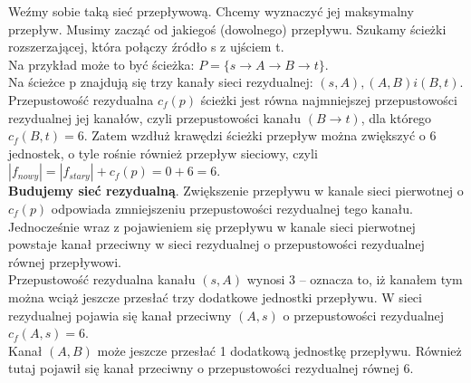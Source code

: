 \documentclass[main.tex]{subfiles}
\begin{document}
\begin{center}
    \end{center}

    Weźmy sobie taką sieć przepływową. Chcemy wyznaczyć jej maksymalny przepływ. Musimy zacząć od jakiegoś (dowolnego)
    przepływu. Szukamy ścieżki rozszerzającej, która połączy źródło s z ujściem t.\\

    Na przykład może to być ścieżka: $P = \{ s  \rightarrow A \rightarrow B \rightarrow t \}$.\\

    Na ścieżce p znajdują się trzy kanały sieci rezydualnej: $(s,A), (A,B) i (B,t)$. Przepustowość rezydualna $c_f(p)$
    ścieżki jest równa najmniejszej przepustowości rezydualnej jej kanałów, czyli przepustowości kanału $(B \rightarrow t)$,
    dla którego $c_f (B,t) = 6$. Zatem wzdłuż krawędzi ścieżki przepływ można zwiększyć o 6 jednostek, o tyle rośnie
    również przepływ sieciowy, czyli $|f_{nowy}| = |f_{stary}| + c_f(p) = 0 + 6 = 6$.\\

    \textbf{Budujemy sieć rezydualną}. Zwiększenie przepływu w kanale sieci pierwotnej o $c_f(p)$ odpowiada
    zmniejszeniu przepustowości rezydualnej tego kanału. Jednocześnie wraz z pojawieniem się przepływu w kanale sieci
    pierwotnej powstaje kanał przeciwny w sieci rezydualnej o przepustowości rezydualnej równej przepływowi.\\

    Przepustowość rezydualna kanału $(s,A)$ wynosi 3 – oznacza to, iż kanałem tym można wciąż jeszcze przesłać trzy
    dodatkowe jednostki przepływu. W sieci rezydualnej pojawia się kanał przeciwny $(A,s)$ o przepustowości rezydualnej
    $c_f(A,s) = 6$.\\

    Kanał $(A,B)$ może jeszcze przesłać 1 dodatkową jednostkę przepływu. Również tutaj pojawił się kanał przeciwny o
    przepustowości rezydualnej równej 6.\\
\end{document}
